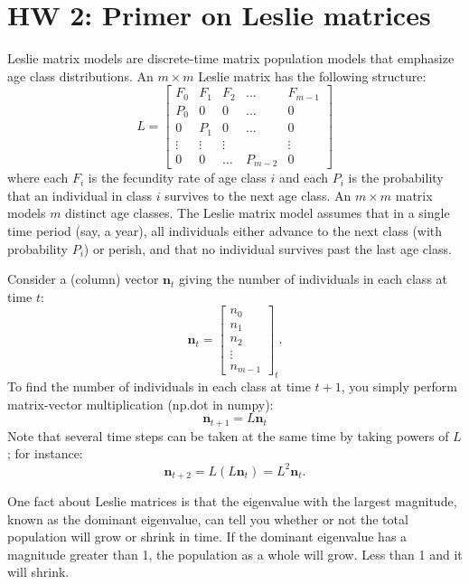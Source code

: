 \documentclass[11pt]{article}
\begin{document}
\section*{HW 2: Primer on Leslie matrices}

Leslie matrix models are discrete-time matrix population models that emphasize age class distributions. An $m\times m$ Leslie matrix has the following structure:
\[L =
\left[\begin{array}{ccccc}
F_0 & F_1 & F_2 & \ldots & F_{m-1} \\ 
P_0 & 0 & 0 &\ldots  & 0 \\ 
0 & P_1 & 0 & \ldots & 0 \\ 
\vdots & \vdots & \vdots & \  & \vdots \\ 
0 & 0 & \ldots & P_{m-2} & 0
\end{array}\right]
\]
where each $F_i$ is the fecundity rate of age class $i$ and each $P_i$ is the probability that an individual in class $i$ survives to the next age class. An $m\times m$ matrix models $m$ distinct age classes. The Leslie matrix model assumes that in a single time period (say, a year), all individuals either advance to the next class (with probability $P_i$) or perish, and that no individual survives past the last age class.

Consider a (column) vector $\mathbf{n}_t$ giving the number of individuals in each class at time $t$:
\[
\mathbf{n}_t = \left[\begin{array}{c}
n_0\\ 
n_1\\ 
n_2\\ 
\vdots\\ 
n_{m-1}
\end{array} \right]_t.
\]
To find the number of individuals in each class at time $t+1$, you simply perform matrix-vector multiplication (np.dot in numpy):
\[
\mathbf{n}_{t+1} = L\mathbf{n}_t
\]
Note that several time steps can be taken at the same time by taking powers of $L$; for instance:
\[
\mathbf{n}_{t+2} = L(L\mathbf{n}_t) = L^2\mathbf{n}_t.
\]

One fact about Leslie matrices is that the eigenvalue with the largest magnitude, known as the dominant eigenvalue, can tell you whether or not the total population will grow or shrink in time. If the dominant eigenvalue has a magnitude greater than 1, the population as a whole will grow. Less than 1 and it will shrink. 
\end{document}
